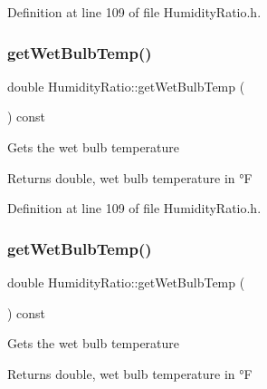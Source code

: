 Definition at line 109 of file Humidity\+Ratio.\+h.

\mbox{\label{class_humidity_ratio_adbadf93878e4867ce283319859d04087}} 
\subsubsection{\texorpdfstring{get\+Wet\+Bulb\+Temp()}{getWetBulbTemp()}\hspace{0.1cm}{\footnotesize\ttfamily [2/3]}}
{\footnotesize\ttfamily double Humidity\+Ratio\+::get\+Wet\+Bulb\+Temp (\begin{DoxyParamCaption}{ }\end{DoxyParamCaption}) const\hspace{0.3cm}{\ttfamily [inline]}}

Gets the wet bulb temperature

\begin{DoxyReturn}{Returns}
double, wet bulb temperature in °F 
\end{DoxyReturn}


Definition at line 109 of file Humidity\+Ratio.\+h.

\mbox{\label{class_humidity_ratio_adbadf93878e4867ce283319859d04087}} 
\subsubsection{\texorpdfstring{get\+Wet\+Bulb\+Temp()}{getWetBulbTemp()}\hspace{0.1cm}{\footnotesize\ttfamily [3/3]}}
{\footnotesize\ttfamily double Humidity\+Ratio\+::get\+Wet\+Bulb\+Temp (\begin{DoxyParamCaption}{ }\end{DoxyParamCaption}) const\hspace{0.3cm}{\ttfamily [inline]}}

Gets the wet bulb temperature

\begin{DoxyReturn}{Returns}
double, wet bulb temperature in °F 
\end{DoxyReturn}


